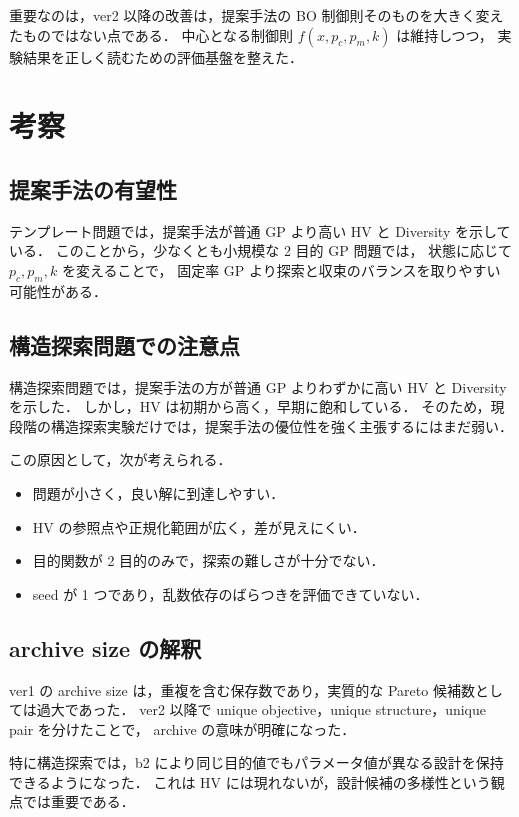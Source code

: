 \documentclass[a4paper,11pt]{ltjsarticle}
\begin{document}
重要なのは，ver2 以降の改善は，提案手法の BO 制御則そのものを大きく変えたものではない点である．
中心となる制御則 \(f(x,p_c,p_m,k)\) は維持しつつ，
実験結果を正しく読むための評価基盤を整えた．

\section{考察}

\subsection{提案手法の有望性}

テンプレート問題では，提案手法が普通 GP より高い HV と Diversity を示している．
このことから，少なくとも小規模な 2 目的 GP 問題では，
状態に応じて \(p_c,p_m,k\) を変えることで，
固定率 GP より探索と収束のバランスを取りやすい可能性がある．

\subsection{構造探索問題での注意点}

構造探索問題では，提案手法の方が普通 GP よりわずかに高い HV と Diversity を示した．
しかし，HV は初期から高く，早期に飽和している．
そのため，現段階の構造探索実験だけでは，提案手法の優位性を強く主張するにはまだ弱い．

この原因として，次が考えられる．
\begin{itemize}[leftmargin=3em]
  \item 問題が小さく，良い解に到達しやすい．
  \item HV の参照点や正規化範囲が広く，差が見えにくい．
  \item 目的関数が 2 目的のみで，探索の難しさが十分でない．
  \item seed が 1 つであり，乱数依存のばらつきを評価できていない．
\end{itemize}

\subsection{archive size の解釈}

ver1 の archive size は，重複を含む保存数であり，実質的な Pareto 候補数としては過大であった．
ver2 以降で unique objective，unique structure，unique pair を分けたことで，
archive の意味が明確になった．

特に構造探索では，b2 により同じ目的値でもパラメータ値が異なる設計を保持できるようになった．
これは HV には現れないが，設計候補の多様性という観点では重要である．
\end{document}
